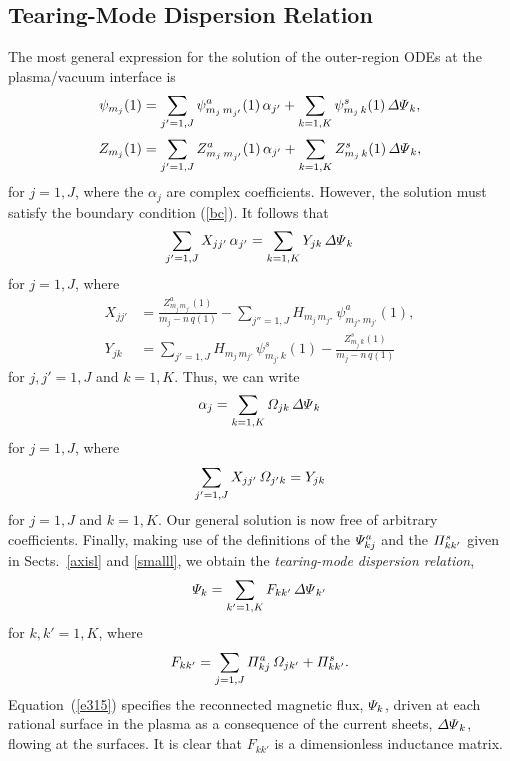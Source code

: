 \documentclass[12pt,prb,aps]{revtex4-1}
\begin{document}
\subsection{Tearing-Mode Dispersion Relation}
The most general expression for the solution of the outer-region ODEs at the plasma/vacuum interface is
\begin{align}\label{e385}
\psi_{m_j}(1) &= \sum_{j'=1,J}\psi_{m_j\,m_{j'}}^a(1)\,\alpha_{j'} + \sum_{k=1,K}\psi_{m_j\,k}^s(1)\,{\mit\Delta\Psi}_k,\\[0.5ex]
Z_{m_j}(1) &= \sum_{j'=1,J}Z_{m_j\,m_{j'}}^a(1)\,\alpha_{j'} + \sum_{k=1,K}Z_{m_j\,k}^s(1)\,{\mit\Delta\Psi}_k,\label{e386}
\end{align}
for $j=1,J$, where the $\alpha_j$ are complex coefficients. However,  the solution must satisfy the boundary condition (\ref{bc}). 
It follows that
\begin{equation}
\sum_{j'=1,J}X_{jj'}\,\alpha_{j'} = \sum_{k=1,K}Y_{jk}\,{\mit\Delta\Psi}_k
\end{equation}
for $j=1,J$, where
\begin{align}
X_{jj'} &=\frac{Z_{m_j\,m_{j'}}^{a}(1)}{m_j-n\,q(1)}-\sum_{j''=1,J}H_{m_j\,m_{j''}}\,\psi_{m_{j''}\,m_{j'}}^a(1),\\[0.5ex]
Y_{jk} &= \sum_{j'=1,J}H_{m_j\,m_{j'}}\,\psi_{m_{j'}\,k}^{s}(1)-
\frac{Z_{m_j\,k}^s(1)}{m_j-n\,q(1)}
\end{align}
for $j,j'=1,J$ and $k=1,K$. Thus, we can write
\begin{equation}
\alpha_j = \sum_{k=1,K}{\mit\Omega}_{jk}\,{\mit\Delta\Psi}_k
\end{equation}
for $j=1,J$, 
where
\begin{equation}
\sum_{j'=1,J}X_{jj'}\,{\mit\Omega}_{j'k} = Y_{jk}
\end{equation}
for $j=1,J$ and $k=1,K$. Our general solution is now free of arbitrary coefficients.
 Finally, making use of the definitions of the ${\mit\Psi}_{kj}^a$ and the ${\mit\Pi}_{kk'}^s$ given in Sects.~\ref{axisl} and \ref{smalll}, we obtain the {\em tearing-mode dispersion relation},\cite{connor,cht,am1,pletz}
\begin{equation}\label{e315}
{\mit\Psi}_k = \sum_{k'=1,K}F_{kk'}\,{\mit\Delta\Psi}_{k'}
\end{equation}
for $k,k'=1,K$, where
\begin{equation}
F_{kk'}=\sum_{j=1,J}{\mit\Pi}^a_{kj}\,{\mit\Omega}_{jk'} + {\mit\Pi}^s_{kk'}.
\end{equation}
Equation~(\ref{e315}) specifies the reconnected magnetic flux, ${\mit\Psi}_k$, driven at each rational surface in the plasma
as a consequence of the current sheets, ${\mit\Delta\Psi}_k$, flowing at the surfaces. It is clear that $F_{kk'}$ is a dimensionless
inductance matrix.\cite{rfbook}
\end{document}

